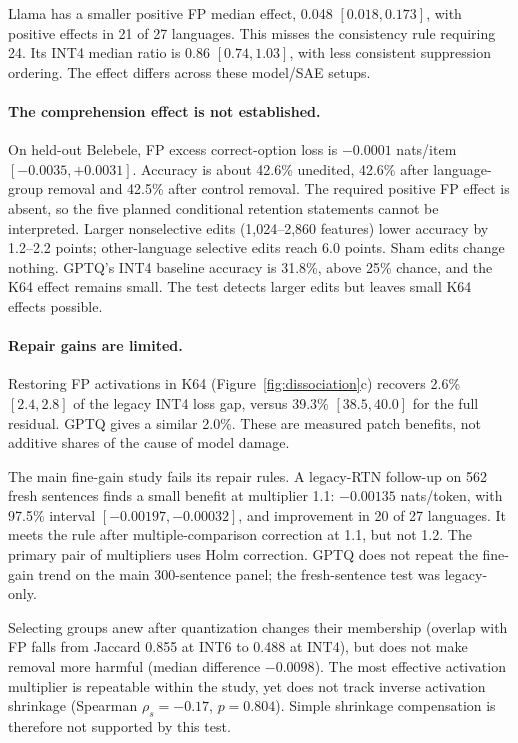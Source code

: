 \documentclass[11pt]{article}
\begin{document}
Llama has a smaller positive FP median effect, 0.048 $[0.018,0.173]$, with positive effects in 21 of 27 languages. This misses the consistency rule requiring 24. Its INT4 median ratio is 0.86 $[0.74,1.03]$, with less consistent suppression ordering. The effect differs across these model/SAE setups.

\paragraph{The comprehension effect is not established.}
On held-out Belebele, FP excess correct-option loss is $-0.0001$ nats/item $[-0.0035,+0.0031]$. Accuracy is about 42.6\% unedited, 42.6\% after language-group removal and 42.5\% after control removal. The required positive FP effect is absent, so the five planned conditional retention statements cannot be interpreted. Larger nonselective edits (1,024--2,860 features) lower accuracy by 1.2--2.2 points; other-language selective edits reach 6.0 points. Sham edits change nothing. GPTQ's INT4 baseline accuracy is 31.8\%, above 25\% chance, and the K64 effect remains small. The test detects larger edits but leaves small K64 effects possible.

\paragraph{Repair gains are limited.}
Restoring FP activations in K64 (Figure~\ref{fig:dissociation}c) recovers 2.6\% $[2.4,2.8]$ of the legacy INT4 loss gap, versus 39.3\% $[38.5,40.0]$ for the full residual. GPTQ gives a similar 2.0\%. These are measured patch benefits, not additive shares of the cause of model damage.

The main fine-gain study fails its repair rules. A legacy-RTN follow-up on 562 fresh sentences finds a small benefit at multiplier 1.1: $-0.00135$ nats/token, with 97.5\% interval $[-0.00197,-0.00032]$, and improvement in 20 of 27 languages. It meets the rule after multiple-comparison correction at 1.1, but not 1.2. The primary pair of multipliers uses Holm correction. GPTQ does not repeat the fine-gain trend on the main 300-sentence panel; the fresh-sentence test was legacy-only.

Selecting groups anew after quantization changes their membership (overlap with FP falls from Jaccard 0.855 at INT6 to 0.488 at INT4), but does not make removal more harmful (median difference $-0.0098$). The most effective activation multiplier is repeatable within the study, yet does not track inverse activation shrinkage (Spearman $\rho_s=-0.17$, $p=0.804$). Simple shrinkage compensation is therefore not supported by this test.
\end{document}
